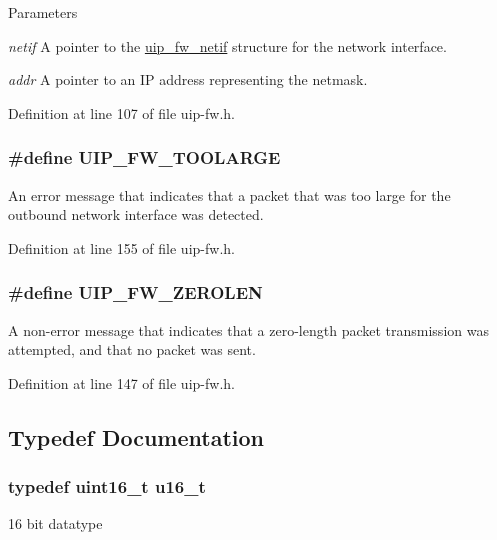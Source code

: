 \begin{DoxyParams}{Parameters}
\item[{\em netif}]A pointer to the \hyperlink{structuip__fw__netif}{uip\_\-fw\_\-netif} structure for the network interface.\item[{\em addr}]A pointer to an IP address representing the netmask. \end{DoxyParams}


Definition at line 107 of file uip-\/fw.h.

\hypertarget{group__uipfw_gaa98780b025dbb97d09b87c40c92d9e4c}{
\subsubsection[{UIP\_\-FW\_\-TOOLARGE}]{\setlength{\rightskip}{0pt plus 5cm}\#define UIP\_\-FW\_\-TOOLARGE}}
\label{group__uipfw_gaa98780b025dbb97d09b87c40c92d9e4c}
An error message that indicates that a packet that was too large for the outbound network interface was detected. 

Definition at line 155 of file uip-\/fw.h.

\hypertarget{group__uipfw_ga29ad276632f8b0a2e41700833d40cb4c}{
\subsubsection[{UIP\_\-FW\_\-ZEROLEN}]{\setlength{\rightskip}{0pt plus 5cm}\#define UIP\_\-FW\_\-ZEROLEN}}
\label{group__uipfw_ga29ad276632f8b0a2e41700833d40cb4c}
A non-\/error message that indicates that a zero-\/length packet transmission was attempted, and that no packet was sent. 

Definition at line 147 of file uip-\/fw.h.



\subsection{Typedef Documentation}
\hypertarget{group__uipfw_ga77570ac4fcab86864fa1916e55676da2}{
\subsubsection[{u16\_\-t}]{\setlength{\rightskip}{0pt plus 5cm}typedef uint16\_\-t {\bf u16\_\-t}}}
\label{group__uipfw_ga77570ac4fcab86864fa1916e55676da2}
16 bit datatype

